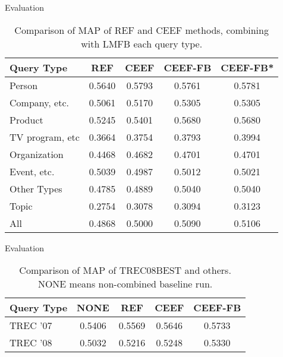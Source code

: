 \documentclass{beamer}
\begin{document}
\begin{frame}{Evaluation}
\begin{table}
	\centering
		\begin{tabular}{lS[tabnumalign=centre,tabformat=1.4,decimalsymbol=comma]S[tabnumalign=centre,tabformat=1.4,decimalsymbol=comma]S[tabnumalign=centre,tabformat=1.4,decimalsymbol=comma]S[tabnumalign=centre,tabformat=1.4,decimalsymbol=comma]}
			\toprule
			Query Type & {REF} & {CEEF} & {CEEF-FB} & {CEEF-FB*}\\
			\midrule
			Person & 0.5640 & 0.5793 & 0.5761 & 0.5781\\
			Company, etc. & 0.5061 & 0.5170 & 0.5305 & 0.5305\\
			Product & 0.5245 & 0.5401 & 0.5680 & 0.5680\\
			TV program, etc & 0.3664 & 0.3754 & 0.3793 & 0.3994\\
			Organization & 0.4468 & 0.4682 & 0.4701 & 0.4701\\
			Event, etc. & 0.5039 & 0.4987 & 0.5012 & 0.5021\\
			Other Types & 0.4785 & 0.4889 & 0.5040 & 0.5040\\
			Topic & 0.2754 & 0.3078 & 0.3094 & 0.3123\\
			All & 0.4868 & 0.5000 & 0.5090 & 0.5106\\
			\bottomrule
		\end{tabular}
		\caption{Comparison of MAP of REF and CEEF methods, combining with LMFB each query type.\cite{paper:NaNg}}
\end{table}

\end{frame}

\begin{frame}{Evaluation}

	\begin{table}
		\centering
		\begin{tabular}{lS[tabnumalign=centre,tabformat=1.4,decimalsymbol=comma]S[tabnumalign=centre,tabformat=1.4,decimalsymbol=comma]S[tabnumalign=centre,tabformat=1.4,decimalsymbol=comma]S[tabnumalign=centre,tabformat=1.4,decimalsymbol=comma]}
			\toprule
			Query Type & {NONE} & {REF} & {CEEF} & {CEEF-FB}\\
			\midrule
			TREC '07 & 0.5406 & 0.5569 & 0.5646 & 0.5733\\
			TREC '08 & 0.5032 & 0.5216 & 0.5248 & 0.5330\\
			\bottomrule
		\end{tabular}
		\caption{Comparison of MAP of TREC08BEST and others. NONE means non-combined baseline run.}
		\cite{paper:NaNg}
	\end{table}
\end{frame}
\end{document}
